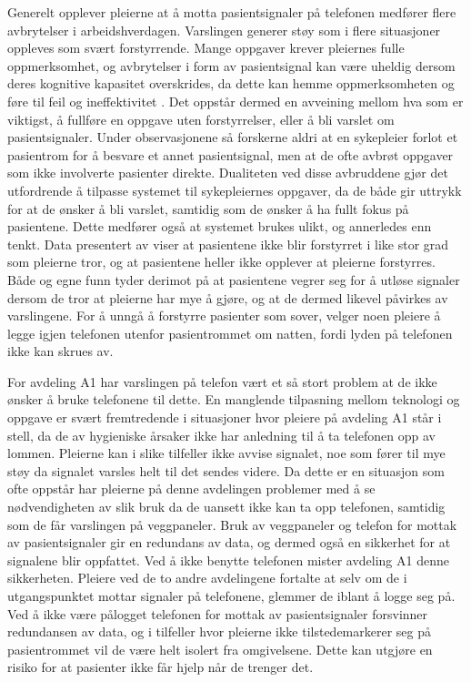 \noindent
Generelt opplever pleierne at å motta pasientsignaler på telefonen medfører flere avbrytelser i arbeidshverdagen. Varslingen generer støy som i flere situasjoner oppleves som svært forstyrrende. Mange oppgaver krever pleiernes fulle oppmerksomhet, og avbrytelser i form av pasientsignal kan være uheldig dersom deres kognitive kapasitet overskrides, da dette kan hemme oppmerksomheten og føre til feil og ineffektivitet \citep{Ebright10, Parker00}. Det oppstår dermed en avveining mellom hva som er viktigst, å fullføre en oppgave uten forstyrrelser, eller å bli varslet om pasientsignaler. Under observasjonene så forskerne aldri at en sykepleier forlot et pasientrom for å besvare et annet pasientsignal, men at de ofte avbrøt oppgaver som ikke involverte pasienter direkte. Dualiteten ved disse avbruddene gjør det utfordrende å tilpasse systemet til sykepleiernes oppgaver, da de både gir uttrykk for at de ønsker å bli varslet, samtidig som de ønsker å ha fullt fokus på pasientene. Dette medfører også at systemet brukes ulikt, og annerledes enn tenkt. Data presentert av \citet{Rygh13} viser at pasientene ikke blir forstyrret i like stor grad som pleierne tror, og at pasientene heller ikke opplever at pleierne forstyrres. Både \citet{Rygh13} og egne funn tyder derimot på at pasientene vegrer seg for å utløse signaler dersom de tror at pleierne har mye å gjøre, og at de dermed likevel påvirkes av varslingene. For å unngå å forstyrre pasienter som sover, velger noen pleiere å legge igjen telefonen utenfor pasientrommet om natten, fordi lyden på telefonen ikke kan skrues av.

\noindent
For avdeling A1 har varslingen på telefon vært et så stort problem at de ikke ønsker å bruke telefonene til dette. En manglende tilpasning mellom teknologi og oppgave er svært fremtredende i situasjoner hvor pleiere på avdeling A1 står i stell, da de av hygieniske årsaker ikke har anledning til å ta telefonen opp av lommen. Pleierne kan i slike tilfeller ikke avvise signalet, noe som fører til mye støy da signalet varsles helt til det sendes videre. Da dette er en situasjon som ofte oppstår har pleierne på denne avdelingen problemer med å se nødvendigheten av slik bruk da de uansett ikke kan ta opp telefonen, samtidig som de får varslingen på veggpaneler. Bruk av veggpaneler og telefon for mottak av pasientsignaler gir en redundans av data, og dermed også en sikkerhet for at signalene blir oppfattet. Ved å ikke benytte telefonen mister avdeling A1 denne sikkerheten. Pleiere ved de to andre avdelingene fortalte at selv om de i utgangspunktet mottar signaler på telefonene, glemmer de iblant å logge seg på. Ved å ikke være pålogget telefonen for mottak av pasientsignaler forsvinner redundansen av data, og i tilfeller hvor pleierne ikke tilstedemarkerer seg på pasientrommet vil de være helt isolert fra omgivelsene. Dette kan utgjøre en risiko for at pasienter ikke får hjelp når de trenger det.

